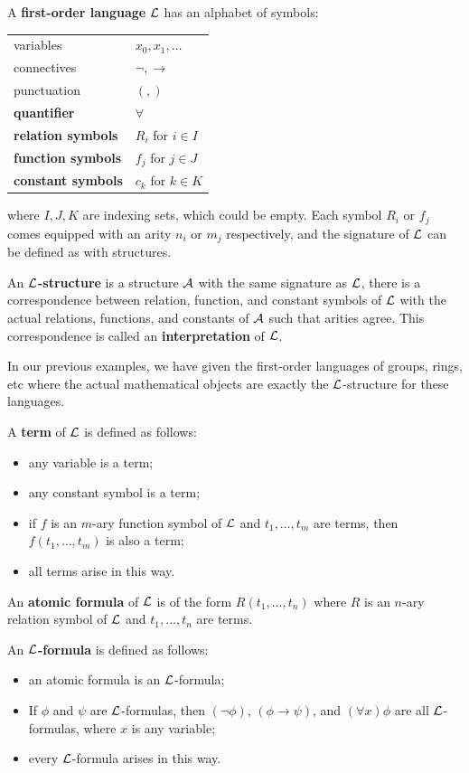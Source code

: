 \documentclass{article}
\begin{document}
\begin{definition}
    A \textbf{first-order language} $\mathcal{L}$ has an alphabet of symbols:
    \begin{center}
    \begin{tabular}{ll}
        variables & $x_0, x_1,\ldots$ \\
        connectives & $\neg,\rightarrow$ \\
        punctuation & $(,)$ \\
        \textbf{quantifier} & $\forall$ \\
        \textbf{relation symbols} & $R_i$ for $i\in I$ \\
        \textbf{function symbols} & $f_j$ for $j\in J$ \\
        \textbf{constant symbols} & $c_k$ for $k\in K$
    \end{tabular}
    \end{center} where $I,J,K$ are indexing sets, which could be empty. Each symbol $R_i$ or $f_j$ comes equipped with an arity $n_i$ or $m_j$ respectively, and the signature of $\mathcal{L}$ can be defined as with structures.

    An \textbf{$\mathcal{L}$-structure} is a structure $\mathcal{A}$ with the same signature as $\mathcal{L}$, there is a correspondence between relation, function, and constant symbols of $\mathcal{L}$ with the actual relations, functions, and constants of $\mathcal{A}$ such that arities agree. This correspondence is called an \textbf{interpretation} of $\mathcal{L}$.
\end{definition}

In our previous examples, we have given the first-order languages of groups, rings, etc where the actual mathematical objects are exactly the $\mathcal{L}$-structure for these languages.

\begin{definition}
    A \textbf{term} of $\mathcal{L}$ is defined as follows:\begin{itemize}
        \item any variable is a term;
        \item any constant symbol is a term;
        \item if $f$ is an $m$-ary function symbol of $\mathcal{L}$ and $t_1,\ldots,t_m$ are terms, then $f(t_1,\ldots,t_m)$ is also a term;
        \item all terms arise in this way.
    \end{itemize}

    An \textbf{atomic formula} of $\mathcal{L}$ is of the form $R(t_1,\ldots,t_n)$ where $R$ is an $n$-ary relation symbol of $\mathcal{L}$ and $t_1,\ldots,t_n$ are terms.

    An \textbf{$\mathcal{L}$-formula} is defined as follows: \begin{itemize}
        \item an atomic formula is an $\mathcal{L}$-formula;
        \item If $\phi$ and $\psi$ are $\mathcal{L}$-formulas, then $(\neg\phi)$, $(\phi\rightarrow\psi)$, and $(\forall x)\phi$ are all $\mathcal{L}$-formulas, where $x$ is any variable;
        \item every $\mathcal{L}$-formula arises in this way.
    \end{itemize}
\end{definition}
\end{document}
